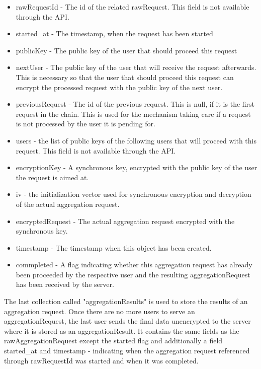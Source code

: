 \begin{itemize}
	\item rawRequestId - The id of the related rawRequest. This field is not available through the API.
	\item started\_at - The timestamp, when the request has been started
	\item publicKey - The public key of the user that should proceed this request
	\item nextUser - The public key of the user that will receive the request afterwards. This is necessary so that the user that should proceed this request can encrypt the processed request with the public key of the next user.
	\item previousRequest - The id of the previous request. This is null, if it is the first request in the chain. This is used for the mechanism taking care if a request is not processed by the user it is pending for.
	\item users - the list of public keys of the following users that will proceed with this request. This field is not available through the API.
	\item encryptionKey - A synchronous key, encrypted with the public key of the user the request is aimed at.
	\item iv - the initialization vector used for synchronous encryption and decryption of the actual aggregation request.
	\item encryptedRequest - The actual aggregation request encrypted with the synchronous key.
	\item timestamp - The timestamp when this object has been created.
	\item commpleted - A flag indicating whether this aggregation request has already been proceeded by the respective user and the resulting aggregationRequest has been received by the server.
\end{itemize}
The last collection called "aggregationResults" is used to store the results of an aggregation request. Once there are no more users to serve an aggregationRequest, the last user sends the final data unencrypted to the server where it is stored as an aggregationResult. It contains the same fields as the rawAggregationRequest except the started flag and additionally a field started\_at and timestamp - indicating when the aggregation request referenced through rawRequestId was started and when it was completed.